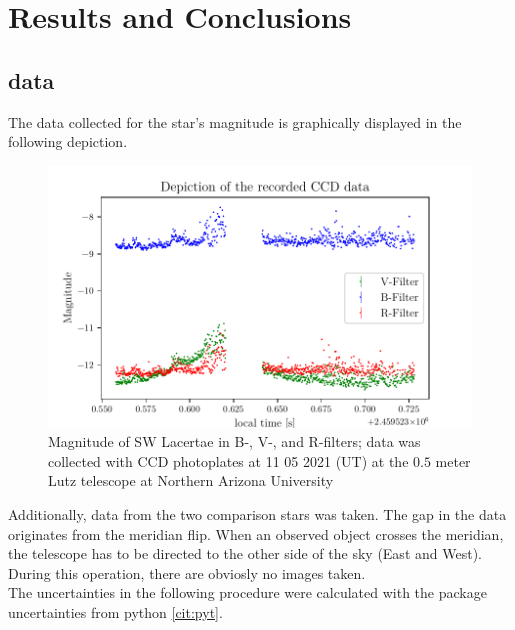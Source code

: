 \section{Results and Conclusions}
\label{sec:make}

\subsection{data}
  \label{sec:America}
  The data collected for the star's magnitude is graphically displayed in the following depiction.
  \begin{figure}[H]
    \centering
    \includegraphics{Magnitude.pdf}
    \caption{Magnitude of SW Lacertae in B-, V-, and R-filters; 
    data was collected with CCD photoplates at 11 05 2021 (UT) at the $0.5$ meter Lutz telescope
    at Northern Arizona University}
  \end{figure}
  Additionally, data from the two comparison stars was taken. The gap in the data originates from 
  the meridian flip. When an observed object crosses the meridian, the telescope has to be directed 
  to the other side of the sky (East and West). During this operation, there are obviosly no
  images taken.\\
  The uncertainties in the following procedure were calculated with the package 
  uncertainties from python \ref{cit:pyt}.

